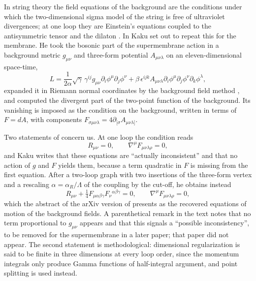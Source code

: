 \documentclass[11pt]{amsart}
\theoremstyle{definition}
\begin{document}
In string theory the field equations of the background are the conditions under which the two-dimensional sigma model of the string is free of ultraviolet divergences; at one loop they are Einstein's equations coupled to the antisymmetric tensor and the dilaton \cite{CFMP85}. In \cite{Kak00} Kaku set out to repeat this for the membrane. He took the bosonic part of the supermembrane action \cite{BST87} in a background metric $g_{\mu\nu}$ and three-form potential $A_{\mu\nu\lambda}$ on an eleven-dimensional space-time,
\begin{equation}\label{eq:action}
L=\frac{1}{2\alpha}\sqrt{\gamma}\,\gamma^{ij}g_{\mu\nu}\partial_i\phi^\mu\partial_j\phi^\nu+\beta\,\epsilon^{ijk}A_{\mu\nu\lambda}\partial_i\phi^\mu\partial_j\phi^\nu\partial_k\phi^\lambda ,
\end{equation}
expanded it in Riemann normal coordinates by the background field method \cite{AGFM81}, and computed the divergent part of the two-point function of the background. Its vanishing is imposed as the condition on the background, written in terms of $F=dA$, with components $F_{\sigma\mu\nu\lambda}=4\partial_{[\sigma}A_{\mu\nu\lambda]}$.

Two statements of \cite{Kak00} concern us. At one loop the condition reads
\begin{equation}\label{eq:oneloop}
R_{\mu\nu}=0,\qquad \nabla^\mu F_{\mu\nu\lambda\rho}=0,
\end{equation}
and Kaku writes that these equations are ``actually inconsistent'' and that no action of $g$ and $F$ yields them, because a term quadratic in $F$ is missing from the first equation. After a two-loop graph with two insertions of the three-form vertex and a rescaling $\alpha=\alpha_R/\Lambda$ of the coupling by the cut-off, he obtains instead
\begin{equation}\label{eq:twoloop}
R_{\mu\nu}+\tfrac14F_{\mu\alpha\beta\gamma}F_\nu{}^{\alpha\beta\gamma}=0,\qquad \nabla^\mu F_{\mu\nu\lambda\rho}=0,
\end{equation}
which the abstract of the arXiv version of \cite{Kak00} presents as the recovered equations of motion of the background fields. A parenthetical remark in the text notes that no term proportional to $g_{\mu\nu}$ appears and that this signals a ``possible inconsistency'', to be removed for the supermembrane in a later paper; that paper did not appear. The second statement is methodological: dimensional regularization is said to be finite in three dimensions at every loop order, since the momentum integrals only produce Gamma functions of half-integral argument, and point splitting is used instead.
\end{document}
